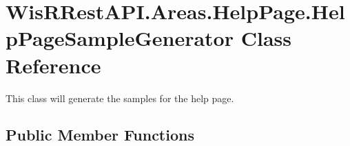 \hypertarget{class_wis_r_rest_a_p_i_1_1_areas_1_1_help_page_1_1_help_page_sample_generator}{}\section{Wis\+R\+Rest\+A\+P\+I.\+Areas.\+Help\+Page.\+Help\+Page\+Sample\+Generator Class Reference}
\label{class_wis_r_rest_a_p_i_1_1_areas_1_1_help_page_1_1_help_page_sample_generator}


This class will generate the samples for the help page.  


\subsection*{Public Member Functions}
